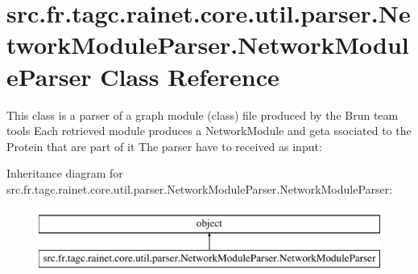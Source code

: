 \hypertarget{classsrc_1_1fr_1_1tagc_1_1rainet_1_1core_1_1util_1_1parser_1_1NetworkModuleParser_1_1NetworkModuleParser}{\section{src.\-fr.\-tagc.\-rainet.\-core.\-util.\-parser.\-Network\-Module\-Parser.\-Network\-Module\-Parser Class Reference}
\label{classsrc_1_1fr_1_1tagc_1_1rainet_1_1core_1_1util_1_1parser_1_1NetworkModuleParser_1_1NetworkModuleParser}
}


This class is a parser of a graph module (class) file produced by the Brun team tools Each retrieved module produces a Network\-Module and geta ssociated to the Protein that are part of it The parser have to received as input\-:  


Inheritance diagram for src.\-fr.\-tagc.\-rainet.\-core.\-util.\-parser.\-Network\-Module\-Parser.\-Network\-Module\-Parser\-:\begin{figure}[H]
\begin{center}
\leavevmode
\includegraphics[height=2.000000cm]{classsrc_1_1fr_1_1tagc_1_1rainet_1_1core_1_1util_1_1parser_1_1NetworkModuleParser_1_1NetworkModuleParser}
\end{center}
\end{figure}
